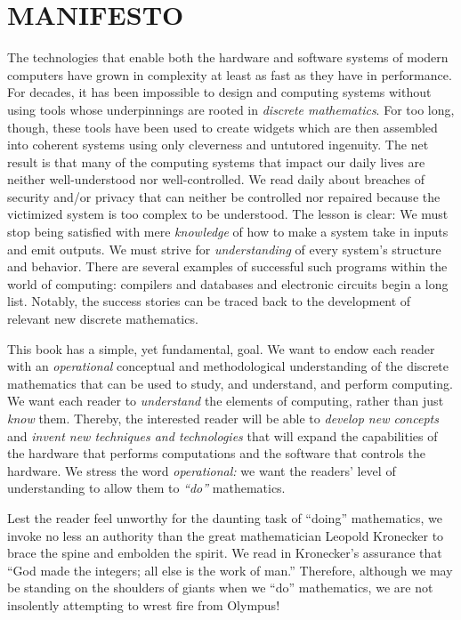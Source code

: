 
\chapter*{MANIFESTO}

The technologies that enable both the hardware and software systems of
modern computers have grown in complexity at least as fast as they
have in performance.  For decades, it has been impossible to design
and computing systems without using tools whose underpinnings are
rooted in {\it discrete mathematics}.  For too long, though, these
tools have been used to create widgets which are then assembled into
coherent systems using only cleverness and untutored ingenuity.  The
net result is that many of the computing systems that impact our daily
lives are neither well-understood nor well-controlled.  We read daily
about breaches of security and/or privacy that can neither be
controlled nor repaired because the victimized system is too complex
to be understood.  The lesson is clear: We must stop being satisfied
with mere {\em knowledge} of how to make a system take in inputs and
emit outputs.  We must strive for {\em understanding} of every
system's structure and behavior.  There are several examples of
successful such programs within the world of computing: compilers and
databases and electronic circuits begin a long list.  Notably, the
success stories can be traced back to the development of relevant new
discrete mathematics.

This book has a simple, yet fundamental, goal.  We want to endow each
reader with an {\em operational} conceptual and methodological
understanding of the discrete mathematics that can be used to study,
and understand, and perform computing.  We want each reader to {\em
  understand} the elements of computing, rather than just {\em know}
them.  Thereby, the interested reader will be able to {\em develop new
  concepts} and {\em invent new techniques and technologies} that will
expand the capabilities of the hardware that performs computations and
the software that controls the hardware.  We stress the word {\it
  operational:} we want the readers' level of understanding to allow
them to {\em ``do''} mathematics.

\bigskip

Lest the reader feel unworthy for the daunting task of ``doing''
mathematics, we invoke no less an authority than the great
mathematician Leopold Kronecker to brace
the spine and embolden the spirit.  We read in \cite{Bell86}
Kronecker's assurance that ``God made the integers; all else is the
work of man.''  Therefore, although we may be standing on the
shoulders of giants when we ``do'' mathematics, we are not insolently
attempting to wrest fire from Olympus!

